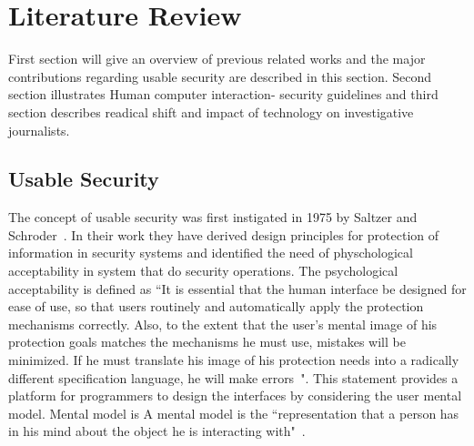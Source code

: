  \chapter{Literature Review}
 \label{chap:relatedwork}
 First section will give an overview of previous related works  and
 the major contributions regarding usable security are described in this section. Second section illustrates Human computer interaction- security guidelines and  third section describes readical shift and impact of technology on investigative journalists.
 \section{Usable Security}
 
 The concept of usable security was first instigated in 1975 by Saltzer and Schroder~\cite{sasse2005usable}. In their work they have derived design principles for protection of information in security systems and identified the need of physchological acceptability in system that do security operations. The psychological acceptability is defined as ``It is essential that the human interface be designed for ease of use, so that users routinely and automatically apply the protection mechanisms correctly. Also, to the extent that the user's mental image of his protection goals matches the mechanisms he must use, mistakes will be minimized. If he must translate his image of his protection needs into a radically different specification language, he will make errors~\cite{saltzer1975protection}". This statement provides a platform for programmers to design the interfaces by considering the user mental model. Mental model is A mental model is the ``representation that a person has in his mind about the object he is interacting with"~\cite{weinschenk2011100}. \\
 
